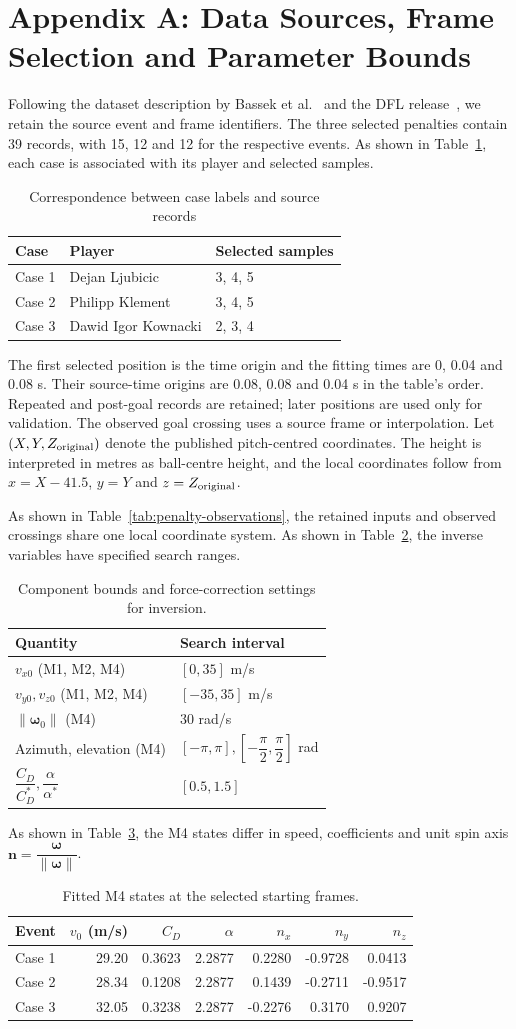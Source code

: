 \documentclass[12pt,letterpaper]{article}
\newcommand{\MFourParameterTable}{\begin{table}[H]\centering\small
\caption{Fitted M4 states at the selected starting frames.}\label{tab:m4-parameters}
\setlength{\tabcolsep}{4pt}\begin{tabular}{lrrrrrr}\toprule
Event & $v_0$ (m/s) & $C_D$ & $\alpha$ & $n_x$ & $n_y$ & $n_z$\\\midrule
Case 1 & 29.20 & 0.3623 & 2.2877 & 0.2280 & -0.9728 & 0.0413\\
Case 2 & 28.34 & 0.1208 & 2.2877 & 0.1439 & -0.2711 & -0.9517\\
Case 3 & 32.05 & 0.3238 & 2.2877 & -0.2276 & 0.3170 & 0.9207\\
\bottomrule\end{tabular}\end{table}}
\newcommand{\InverseBoundsTable}{\begin{table}[H]\centering\footnotesize
\caption{Component bounds and force-correction settings for inversion.}\label{tab:inverse-bounds}
\setlength{\tabcolsep}{4pt}\begin{tabular}{ll}\toprule
Quantity & Search interval\\\midrule
$v_{x0}$ (M1, M2, M4) & $[0,35]$ m/s\\
$v_{y0},v_{z0}$ (M1, M2, M4) & $[-35,35]$ m/s\\
$\|\boldsymbol\omega_0\|$ (M4) & $30$ rad/s\\
Azimuth, elevation (M4) & $[-\pi,\pi],[-\dfrac{\pi}{2},\dfrac{\pi}{2}]$ rad\\
$\dfrac{C_D}{C_D^*},\dfrac{\alpha}{\alpha^*}$ & $[0.5,1.5]$\\
\bottomrule\end{tabular}\end{table}}
\begin{document}
\newpage\section*{Appendix A: Data Sources, Frame Selection and Parameter Bounds}\label{app:data}
\begingroup\def\small{\fontsize{10}{11}\selectfont}\small\setlength{\intextsep}{3pt}\captionsetup{font=small,skip=3pt}\renewcommand{\arraystretch}{.95}
Following the dataset description by Bassek et al.\ \cite{bassek} and the DFL release~\cite{dataset}, we retain the source event and frame identifiers. The three selected penalties contain 39 records, with 15, 12 and 12 for the respective events. As shown in Table~\ref{tab:data-provenance}, each case is associated with its player and selected samples.
\begin{table}[H]\centering\small\caption{Correspondence between case labels and source records}\label{tab:data-provenance}
\begin{tabular}{lll}\toprule
Case & Player & Selected samples\\\midrule
Case 1 & Dejan Ljubicic & 3, 4, 5\\
Case 2 & Philipp Klement & 3, 4, 5\\
Case 3 & Dawid Igor Kownacki & 2, 3, 4\\\bottomrule
\end{tabular}\end{table}
The first selected position is the time origin and the fitting times are 0, 0.04 and 0.08 s. Their source-time origins are 0.08, 0.08 and 0.04 s in the table's order. Repeated and post-goal records are retained; later positions are used only for validation. The observed goal crossing uses a source frame or interpolation. Let $(X,Y,Z_{\rm original})$ denote the published pitch-centred coordinates. The height is interpreted in metres as ball-centre height, and the local coordinates follow from $x=X-41.5$, $y=Y$ and $z=Z_{\rm original}$.

As shown in Table~\ref{tab:penalty-observations}, the retained inputs and observed crossings share one local coordinate system. As shown in Table~\ref{tab:inverse-bounds}, the inverse variables have specified search ranges.

\InverseBoundsTable
As shown in Table~\ref{tab:m4-parameters}, the M4 states differ in speed, coefficients and unit spin axis $\boldsymbol n=\dfrac{\boldsymbol\omega}{\|\boldsymbol\omega\|}$.
\MFourParameterTable
\end{document}
